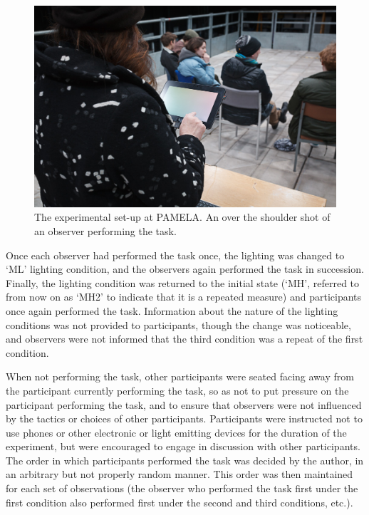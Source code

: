 \begin{figure}[p]
\includegraphics[max width=\textwidth]{figs/tablet/PAMELAobs2.jpg} 
\caption{The experimental set-up at \gls{PAMELA}. An over the shoulder shot of an observer performing the task.}
\label{fig:PAMELAobs2}
\end{figure}

Once each observer had performed the task once, the lighting was changed to `ML' lighting condition, and the observers again performed the task in succession. Finally, the lighting condition was returned to the initial state (`MH', referred to from now on as `MH2' to indicate that it is a repeated measure) and participants once again performed the task. Information about the nature of the lighting conditions was not provided to participants, though the change was noticeable, and observers were not informed that the third condition was a repeat of the first condition. 

When not performing the task, other participants were seated facing away from the participant currently performing the task, so as not to put pressure on the participant performing the task, and to ensure that observers were not influenced by the tactics or choices of other participants. Participants were instructed not to use phones or other electronic or light emitting devices for the duration of the experiment, but were encouraged to engage in discussion with other participants. The order in which participants performed the task was decided by the author, in an arbitrary but not properly random manner. This order was then maintained for each set of observations (the observer who performed the task first under the first condition also performed first under the second and third conditions, etc.).

